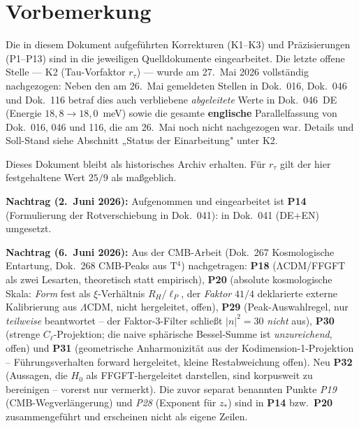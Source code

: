 
\section*{Vorbemerkung}

\begin{tcolorbox}[colback=green!6!white, colframe=green!55!black, title={Status: K1--K3, P1--P32 (P16/P17 teilw., P20/P30/P32 offen, P29 teilw., P31 teilw. hergeleitet) (Stand 7.~Juni 2026)}]
Die in diesem Dokument aufgeführten Korrekturen (K1–K3) und
Präzisierungen (P1–P13) sind in die jeweiligen Quelldokumente
eingearbeitet. Die letzte offene Stelle --- K2 (Tau-Vorfaktor
$r_\tau$) --- wurde am 27.~Mai 2026 vollständig nachgezogen: Neben den am
26.~Mai gemeldeten Stellen in Dok.~016, Dok.~046 und Dok.~116 betraf dies
auch verbliebene \emph{abgeleitete} Werte in Dok.~046~DE (Energie
$18{,}8 \to 18{,}0$~meV) sowie die gesamte \textbf{englische} Parallelfassung
von Dok.~016, 046 und 116, die am 26.~Mai noch nicht nachgezogen war.
Details und Soll-Stand siehe Abschnitt „Status der Einarbeitung" unter K2.

Dieses Dokument bleibt als historisches Archiv erhalten.
Für $r_\tau$ gilt der hier festgehaltene Wert $25/9$ als maßgeblich.

\medskip

\textbf{Nachtrag (2.~Juni 2026):} Aufgenommen und eingearbeitet ist \textbf{P14}
(Formulierung der Rotverschiebung in Dok.~041): in Dok.~041 (DE+EN) umgesetzt.

\medskip

\textbf{Nachtrag (6.~Juni 2026):} Aus der CMB-Arbeit (Dok.~267 Kosmologische
Entartung, Dok.~268 CMB-Peaks aus T$^4$) nachgetragen: \textbf{P18}
(ΛCDM/FFGFT als zwei Lesarten, theoretisch statt empirisch),
\textbf{P20} (absolute kosmologische Skala: \emph{Form} fest als $\xi$-Verhältnis $R_H/\ell_P$, der \emph{Faktor} $41/4$ deklarierte externe Kalibrierung aus $\Lambda$CDM, nicht hergeleitet, offen), \textbf{P29} (Peak-Auswahlregel,
nur \emph{teilweise} beantwortet -- der Faktor-3-Filter schließt $|n|^2=30$
\emph{nicht} aus), \textbf{P30} (strenge $C_\ell$-Projektion; die naive
sphärische Bessel-Summe ist \emph{unzureichend}, offen) und \textbf{P31}
(geometrische Anharmonizität aus der Kodimension-1-Projektion -- Führungsverhalten
forward hergeleitet, kleine Restabweichung offen). Neu \textbf{P32} (Aussagen, die $H_0$ als FFGFT-hergeleitet darstellen, sind korpusweit zu bereinigen -- vorerst nur vermerkt). Die zuvor separat benannten Punkte
\emph{P19} (CMB-Wegverlängerung) und \emph{P28} (Exponent für $z_*$) sind in
\textbf{P14} bzw.\ \textbf{P20} zusammengeführt und erscheinen nicht als
eigene Zeilen.
\end{tcolorbox}

